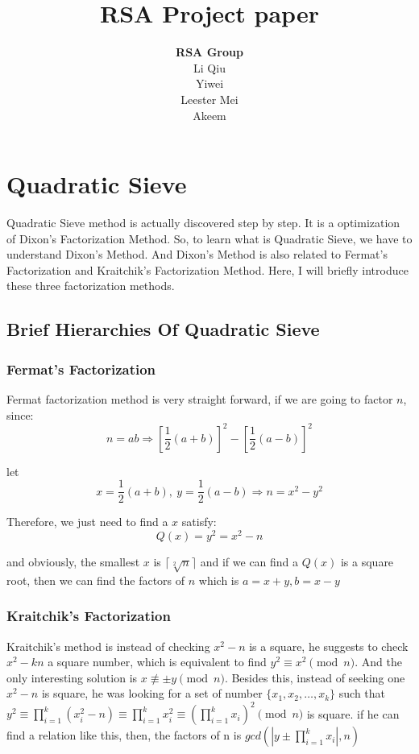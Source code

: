 \documentclass[12pt]{article} %
\title{RSA Project paper}
\author{\textbf{RSA Group}\\Li Qiu\\Yiwei \\Leester Mei\\Akeem}
\begin{document}
\maketitle

\section{Quadratic Sieve}

Quadratic Sieve method is actually discovered step by step. It is a optimization of Dixon's Factorization Method. So, to learn what is Quadratic Sieve, we have to understand Dixon's Method. And Dixon's Method is also related to Fermat's Factorization and Kraitchik's Factorization Method. Here, I will briefly introduce these three factorization methods.

\subsection {Brief Hierarchies Of Quadratic Sieve}

\subsubsection {Fermat's Factorization}
Fermat factorization method is very straight forward, if we are going to factor $n$, since: $$n = ab \Rightarrow \left [\frac{1}{2}(a+b) \right ]^{2} - \left [\frac{1}{2}(a-b) \right ]^{2}$$

let $$ x= \frac{1}{2}(a+b),\ y= \frac{1}{2}(a-b) \Rightarrow n = x^2 - y^2$$ 

Therefore, we just need to find a $x$ satisfy: $$Q(x) = y^2 = x^2 - n$$ 

and obviously, the smallest $x$ is $\lceil \sqrt[2]{n}\rceil$ and if we can find a $Q(x)$ is a square root, then we can find the factors of $n$ which is $a=x+y, b=x-y$

\subsubsection {Kraitchik's Factorization}
Kraitchik's method is instead of checking $x^2-n$ is a square, he suggests to check $x^2 - kn$ a square number, which is equivalent to find $y^2 \equiv x^2 \pmod{n} $. And the only interesting solution is $ x \not\equiv \pm y \pmod{n}$. Besides this, instead of seeking one $x^2-n$ is square, he was looking for a set of number $ \{x_1, x_2, \dots, x_k\} $ such that $\displaystyle y^2 \equiv \prod_{i=1}^k{(x_i^2 - n)} \equiv \prod_{i=1}^k{x_i^2} \equiv \left (\prod_{i=1}^k{x_i}\right)^2 \pmod{n} $ is square. if he can find a relation like this, then, the factors of n is $\displaystyle gcd(|y \pm \prod_{i=1}^k{x_i}|, n)$
\end{document}
